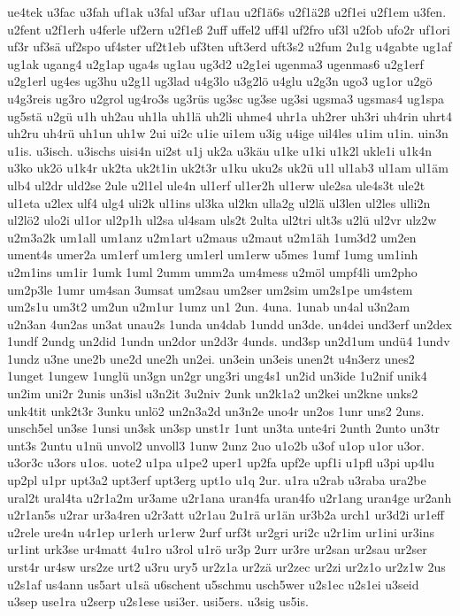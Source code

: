 {ue4tek
u3fac
u3fah
uf1ak
u3fal
uf3ar
uf1au
u2f1ä6s
u2f1ä2ß
u2f1ei
u2f1em
u3fen.
u2fent
u2f1erh
u4ferle
uf2ern
u2f1eß
2uff
uffel2
uff4l
uf2fro
uf3l
u2fob
ufo2r
uf1ori
uf3r
uf3sä
uf2spo
uf4ster
uf2t1eb
uf3ten
uft3erd
uft3s2
u2fum
2u1g
u4gabte
ug1af
ug1ak
ugang4
u2g1ap
uga4s
ug1au
ug3d2
u2g1ei
ugenma3
ugenmas6
u2g1erf
u2g1erl
ug4es
ug3hu
u2g1l
ug3lad
u4g3lo
u3g2lö
u4glu
u2g3n
ugo3
ug1or
u2gö
u4g3reis
ug3ro
u2grol
ug4ro3s
ug3rüs
ug3sc
ug3se
ug3si
ugsma3
ugsmas4
ug1spa
ug5stä
u2gü
u1h
uh2au
uh1la
uh1lä
uh2li
uhme4
uhr1a
uh2rer
uh3ri
uh4rin
uhrt4
uh2ru
uh4rü
uh1un
uh1w
2ui
ui2c
u1ie
ui1em
u3ig
u4ige
uil4les
u1im
u1in.
uin3n
u1is.
u3isch.
u3ischs
uisi4n
ui2st
u1j
uk2a
u3käu
u1ke
u1ki
u1k2l
ukle1i
u1k4n
u3ko
uk2ö
u1k4r
uk2ta
uk2t1in
uk2t3r
u1ku
uku2s
uk2ü
u1l
ul1ab3
ul1am
ul1äm
ulb4
ul2dr
uld2se
2ule
u2l1el
ule4n
ul1erf
ul1er2h
ul1erw
ule2sa
ule4s3t
ule2t
ul1eta
u2lex
ulf4
ulg4
uli2k
ul1ins
ul3ka
ul2kn
ulla2g
ul2lä
ul3len
ul2les
ulli2n
ul2lö2
ulo2i
ul1or
ul2p1h
ul2sa
ul4sam
uls2t
2ulta
ul2tri
ult3s
u2lü
ul2vr
ulz2w
u2m3a2k
um1all
um1anz
u2m1art
u2maus
u2maut
u2m1äh
1um3d2
um2en
ument4s
umer2a
um1erf
um1erg
um1erl
um1erw
u5mes
1umf
1umg
um1inh
u2m1ins
um1ir
1umk
1uml
2umm
umm2a
um4mess
u2möl
umpf4li
um2pho
um2p3le
1umr
um4san
3umsat
um2sau
um2ser
um2sim
um2s1pe
um4stem
um2s1u
um3t2
um2un
u2m1ur
1umz
un1
2un.
4una.
1unab
un4al
u3n2am
u2n3an
4un2as
un3at
unau2s
1unda
un4dab
1undd
un3de.
un4dei
und3erf
un2dex
1undf
2undg
un2did
1undn
un2dor
un2d3r
4unds.
und3sp
un2d1um
undü4
1undv
1undz
u3ne
une2b
une2d
une2h
un2ei.
un3ein
un3eis
unen2t
u4n3erz
unes2
1unget
1ungew
1unglü
un3gn
un2gr
ung3ri
ung4s1
un2id
un3ide
1u2nif
unik4
un2im
uni2r
2unis
un3isl
u3n2it
3u2niv
2unk
un2k1a2
un2kei
un2kne
unks2
unk4tit
unk2t3r
3unku
unlö2
un2n3a2d
un3n2e
uno4r
un2os
1unr
uns2
2uns.
unsch5el
un3se
1unsi
un3sk
un3sp
unst1r
1unt
un3ta
unte4ri
2unth
2unto
un3tr
unt3s
2untu
u1nü
unvol2
unvoll3
1unw
2unz
2uo
u1o2b
u3of
u1op
u1or
u3or.
u3or3c
u3ors
u1os.
uote2
u1pa
u1pe2
uper1
up2fa
upf2e
upf1i
u1pfl
u3pi
up4lu
up2pl
u1pr
upt3a2
upt3erf
upt3erg
upt1o
u1q
2ur.
u1ra
u2rab
u3raba
ura2be
ural2t
ural4ta
u2r1a2m
ur3ame
u2r1ana
uran4fa
uran4fo
u2r1ang
uran4ge
ur2anh
u2r1an5s
u2rar
ur3a4ren
u2r3att
u2r1au
2u1rä
ur1än
ur3b2a
urch1
ur3d2i
ur1eff
u2rele
ure4n
u4r1ep
ur1erh
ur1erw
2urf
urf3t
ur2gri
uri2c
u2r1im
ur1ini
ur3ins
ur1int
urk3se
ur4matt
4u1ro
u3rol
u1rö
ur3p
2urr
ur3re
ur2san
ur2sau
ur2ser
urst4r
ur4sw
urs2ze
urt2
u3ru
ury5
ur2z1a
ur2zä
ur2zec
ur2zi
ur2z1o
ur2z1w
2us
u2s1af
us4ann
us5art
u1sä
u6schent
u5schmu
usch5wer
u2s1ec
u2s1ei
u3seid
u3sep
use1ra
u2serp
u2s1ese
usi3er.
usi5ers.
u3sig
us5is.
}

